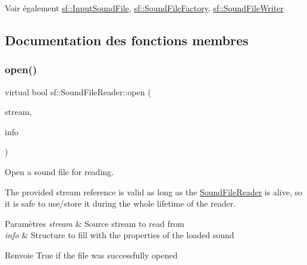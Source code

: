 \begin{DoxySeeAlso}{Voir également}
\hyperlink{classsf_1_1InputSoundFile}{sf\+::\+Input\+Sound\+File}, \hyperlink{classsf_1_1SoundFileFactory}{sf\+::\+Sound\+File\+Factory}, \hyperlink{classsf_1_1SoundFileWriter}{sf\+::\+Sound\+File\+Writer} 
\end{DoxySeeAlso}


\subsection{Documentation des fonctions membres}
\mbox{\label{classsf_1_1SoundFileReader_aa1d2fee2ba8f359c833ab74590d55935}} 
\subsubsection{\texorpdfstring{open()}{open()}}
{\footnotesize\ttfamily virtual bool sf\+::\+Sound\+File\+Reader\+::open (\begin{DoxyParamCaption}\item[{\hyperlink{classsf_1_1InputStream}{Input\+Stream} \&}]{stream,  }\item[{\hyperlink{structsf_1_1SoundFileReader_1_1Info}{Info} \&}]{info }\end{DoxyParamCaption})\hspace{0.3cm}{\ttfamily [pure virtual]}}



Open a sound file for reading. 

The provided stream reference is valid as long as the \hyperlink{classsf_1_1SoundFileReader}{Sound\+File\+Reader} is alive, so it is safe to use/store it during the whole lifetime of the reader.


\begin{DoxyParams}{Paramètres}
{\em stream} & Source stream to read from \\
\hline
{\em info} & Structure to fill with the properties of the loaded sound\\
\hline
\end{DoxyParams}
\begin{DoxyReturn}{Renvoie}
True if the file was successfully opened 
\end{DoxyReturn}
\mbox{\label{classsf_1_1SoundFileReader_a3b7d86769ea07e24e7b0f0486bed7591}} 

